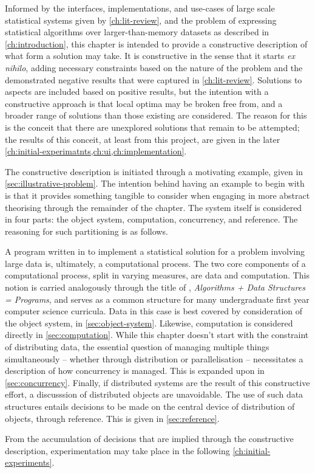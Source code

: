 Informed by the interfaces, implementations, and use-cases of large scale statistical systems given by \cref{ch:lit-review}, and the problem of expressing statistical algorithms over larger-than-memory datasets as described in \cref{ch:introduction}, this chapter is intended to provide a constructive description of what form a solution may take.
It is constructive in the sense that it starts \textit{ex nihilo}, adding necessary constraints based on the nature of the problem and the demonstrated negative results that were captured in \cref{ch:lit-review}.
Solutions to aspects are included based on positive results, but the intention with a constructive approach is that local optima may be broken free from, and a broader range of solutions than those existing are considered.
The reason for this is the conceit that there are unexplored solutions that remain to be attempted; the results of this conceit, at least from this project, are given in the later \cref{ch:initial-experimatnts,ch:ui,ch:implementation}.

The constructive description is initiated through a motivating example, given in \cref{sec:illustrative-problem}.
The intention behind having an example to begin with is that it provides something tangible to consider when engaging in more abstract theorising through the remainder of the chapter.
The system itself is considered in four parts: the object system, computation, concurrency, and reference.
The reasoning for such partitioning is as follows.

A program written in \R{} to implement a statistical solution for a problem involving large data is, ultimately, a computational process.
The two core components of a computational process, split in varying measures, are data and computation\cite{abelson1996sicp}.
This notion is carried analogously through the title of \textcite{wirth1985algorithms}, \textit{Algorithms + Data Structures = Programs}, and serves as a common structure for many undergraduate first year computer science curricula.
Data in this case is best covered by consideration of the object system, in \cref{sec:object-system}.
Likewise, computation is considered directly in \cref{sec:computation}.
While this chapter doesn't start with the constraint of distributing data, the essential question of managing multiple things simultaneously -- whether through distribution or parallelisation -- necessitates a description of how concurrency is managed.
This is expanded upon in \cref{sec:concurrency}.
Finally, if distributed systems are the result of this constructive effort, a discusssion of distributed objects are unavoidable.
The use of such data structures entails decisions to be made on the central device of distribution of objects, through reference.
This is given in \cref{sec:reference}.

From the accumulation of decisions that are implied through the constructive description, experimentation may take place in the following \cref{ch:initial-experiments}.
